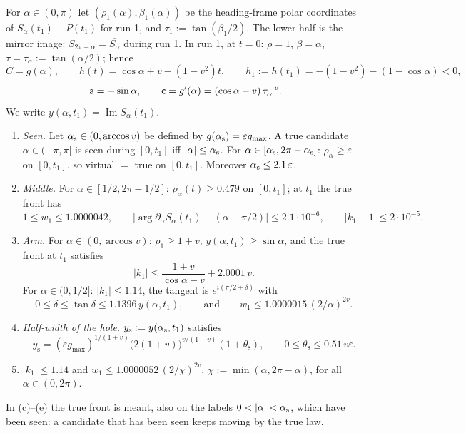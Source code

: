 \medskip
For $\alpha\in(0,\pi)$ let $(\rho_1(\alpha),\beta_1(\alpha))$ be the heading-frame polar coordinates of $S_\alpha(t_1)-P(t_1)$ for run 1,
and $\tau_1:=\tan(\beta_1/2)$. The lower half is the mirror image: $S_{2\pi-\alpha}=\overline{S_\alpha}$ during run 1. In run 1, at
$t=0$: $\rho=1$, $\beta=\alpha$, $\tau=\tau_\alpha:=\tan(\alpha/2)$; hence
\[
C=g(\alpha),\qquad h(t)=\cos\alpha+v-(1-v^2)t,\qquad h_1:=h(t_1)=-(1-v^2)-(1-\cos\alpha)<0,
\]
\[
\mathsf a=-\sin\alpha,\qquad\mathsf c=g'(\alpha)=(\cos\alpha-v)\,\tau_\alpha^{-v}.
\]
We write $y(\alpha,t_1)=\operatorname{Im}S_\alpha(t_1)$.

\begin{lemma}[Run 1]\label{lem:T1-run1}
\begin{enumerate}
\item[(a)] \emph{Seen.} Let $\alpha_{\mathrm s}\in(0,\arccos v)$ be defined by $g(\alpha_{\mathrm s})=\varepsilon g_{\max}$. A true candidate
$\alpha\in(-\pi,\pi]$ is seen during $[0,t_1]$ iff $|\alpha|\le\alpha_{\mathrm s}$. For $\alpha\in[\alpha_{\mathrm s},2\pi-\alpha_{\mathrm s}]$: $\rho_\alpha\ge\varepsilon$
on $[0,t_1]$, so virtual $=$ true on $[0,t_1]$. Moreover $\alpha_{\mathrm s}\le2.1\,\varepsilon$.
\item[(b)] \emph{Middle.} For $\alpha\in[1/2,2\pi-1/2]$: $\rho_\alpha(t)\ge0.479$ on $[0,t_1]$; at $t_1$ the true front has
\[
1\le w_1\le1.0000042,\qquad\bigl|\arg\partial_\alpha S_\alpha(t_1)-(\alpha+\pi/2)\bigr|\le2.1\cdot10^{-6},\qquad|k_1-1|\le2\cdot10^{-5}.
\]
\item[(c)] \emph{Arm.} For $\alpha\in(0,\arccos v)$: $\rho_1\ge1+v$, $y(\alpha,t_1)\ge\sin\alpha$, and the true front at $t_1$ satisfies
\[
|k_1|\le\frac{1+v}{\cos\alpha-v}+2.0001\,v .
\]
For $\alpha\in(0,1/2]$: $|k_1|\le1.14$, the tangent is $e^{i(\pi/2+\delta)}$ with
\[
0\le\delta\le\tan\delta\le1.1396\,y(\alpha,t_1),\qquad\text{and}\qquad w_1\le1.0000015\,(2/\alpha)^{2v}.
\]
\item[(d)] \emph{Half-width of the hole.} $y_{\mathrm s}:=y(\alpha_{\mathrm s},t_1)$ satisfies
\[
y_{\mathrm s}=(\varepsilon g_{\max})^{1/(1+v)}\bigl(2(1+v)\bigr)^{v/(1+v)}(1+\theta_{\mathrm s}),\qquad0\le\theta_{\mathrm s}\le0.51\,v\varepsilon .
\]
\item[(e)] $|k_1|\le1.14$ and $w_1\le1.0000052\,(2/\chi)^{2v}$, $\chi:=\min(\alpha,2\pi-\alpha)$, for all $\alpha\in(0,2\pi)$.
\end{enumerate}
\end{lemma}
In (c)--(e) the true front is meant, also on the labels $0<|\alpha|<\STas$, which have been seen: a candidate that has been seen
keeps moving by the true law.
